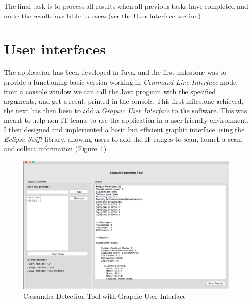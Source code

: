 \documentclass[a4paper]{report}
\begin{document}
The final task is to process all results when all previous tasks have completed and make the results available to users (see the User Interface section).

\section{User interfaces}
The application has been developed in Java, and the first milestone was to provide a functioning basic version working in \emph{Command Line Interface} mode, from a console window we can call the Java program with the specified arguments, and get a result printed in the console. This first milestone achieved, the next has then been to add a \emph{Graphic User Interface} to the software. This was meant to help non-IT teams to use the application in a user-friendly environment. I then designed and implemented a basic but efficient graphic interface using the \emph{Eclipse Swift} library, allowing users to add the IP ranges to scan, launch a scan, and collect information (Figure~\ref{fig:cdt}).

\begin{figure}[ht!]
\centering
\includegraphics[scale=0.37]{cdt-preview.png}
\caption{Cassandra Detection Tool with Graphic User Interface}
\label{fig:cdt}
\end{figure}
\end{document}
